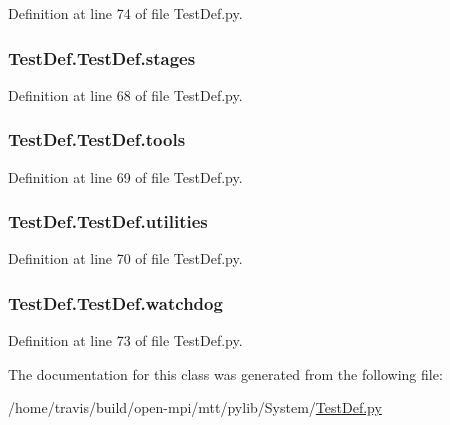 Definition at line 74 of file Test\-Def.\-py.

\hypertarget{classTestDef_1_1TestDef_a9e15c13bd0cc9b1567c94f847118432e}{
\subsubsection[{stages}]{\setlength{\rightskip}{0pt plus 5cm}Test\-Def.\-Test\-Def.\-stages}}\label{classTestDef_1_1TestDef_a9e15c13bd0cc9b1567c94f847118432e}


Definition at line 68 of file Test\-Def.\-py.

\hypertarget{classTestDef_1_1TestDef_a2414cc1583555b0c758e0f9f0952a787}{
\subsubsection[{tools}]{\setlength{\rightskip}{0pt plus 5cm}Test\-Def.\-Test\-Def.\-tools}}\label{classTestDef_1_1TestDef_a2414cc1583555b0c758e0f9f0952a787}


Definition at line 69 of file Test\-Def.\-py.

\hypertarget{classTestDef_1_1TestDef_a0b9ea6f06c02401ad62e06c4cfd80bd2}{
\subsubsection[{utilities}]{\setlength{\rightskip}{0pt plus 5cm}Test\-Def.\-Test\-Def.\-utilities}}\label{classTestDef_1_1TestDef_a0b9ea6f06c02401ad62e06c4cfd80bd2}


Definition at line 70 of file Test\-Def.\-py.

\hypertarget{classTestDef_1_1TestDef_a40da46aa95507cffa798cb152fa69e27}{
\subsubsection[{watchdog}]{\setlength{\rightskip}{0pt plus 5cm}Test\-Def.\-Test\-Def.\-watchdog}}\label{classTestDef_1_1TestDef_a40da46aa95507cffa798cb152fa69e27}


Definition at line 73 of file Test\-Def.\-py.



The documentation for this class was generated from the following file\-:\begin{DoxyCompactItemize}
\item 
/home/travis/build/open-\/mpi/mtt/pylib/\-System/\hyperlink{TestDef_8py}{Test\-Def.\-py}\end{DoxyCompactItemize}
